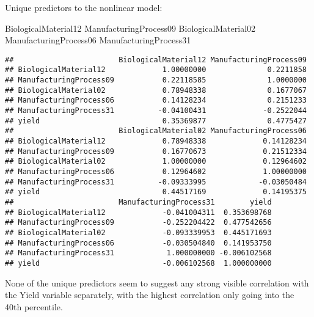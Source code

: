 \documentclass[
]{article}
\newenvironment{Shaded}{\begin{snugshade}}{\end{snugshade}}
\newcommand{\AttributeTok}[1]{\textcolor[rgb]{0.77,0.63,0.00}{#1}}
\newcommand{\FunctionTok}[1]{\textcolor[rgb]{0.00,0.00,0.00}{#1}}
\newcommand{\NormalTok}[1]{#1}
\newcommand{\OtherTok}[1]{\textcolor[rgb]{0.56,0.35,0.01}{#1}}
\newcommand{\SpecialCharTok}[1]{\textcolor[rgb]{0.00,0.00,0.00}{#1}}
\begin{document}
Unique predictors to the nonlinear model:

BiologicalMaterial12 ManufacturingProcess09 BiologicalMaterial02
ManufacturingProcess06 ManufacturingProcess31

\begin{Shaded}
\end{Shaded}

\begin{verbatim}
##                        BiologicalMaterial12 ManufacturingProcess09
## BiologicalMaterial12             1.00000000              0.2211858
## ManufacturingProcess09           0.22118585              1.0000000
## BiologicalMaterial02             0.78948338              0.1677067
## ManufacturingProcess06           0.14128234              0.2151233
## ManufacturingProcess31          -0.04100431             -0.2522044
## yield                            0.35369877              0.4775427
##                        BiologicalMaterial02 ManufacturingProcess06
## BiologicalMaterial12             0.78948338             0.14128234
## ManufacturingProcess09           0.16770673             0.21512334
## BiologicalMaterial02             1.00000000             0.12964602
## ManufacturingProcess06           0.12964602             1.00000000
## ManufacturingProcess31          -0.09333995            -0.03050484
## yield                            0.44517169             0.14195375
##                        ManufacturingProcess31        yield
## BiologicalMaterial12             -0.041004311  0.353698768
## ManufacturingProcess09           -0.252204422  0.477542656
## BiologicalMaterial02             -0.093339953  0.445171693
## ManufacturingProcess06           -0.030504840  0.141953750
## ManufacturingProcess31            1.000000000 -0.006102568
## yield                            -0.006102568  1.000000000
\end{verbatim}

None of the unique predictors seem to suggest any strong visible
correlation with the Yield variable separately, with the highest
correlation only going into the 40th percentile.
\end{document}
